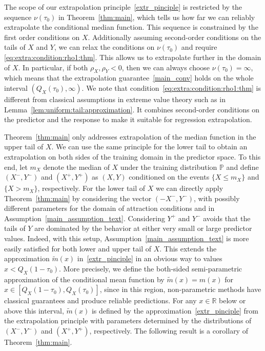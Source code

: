 \documentclass{statsoc}
\theoremstyle{break}
\newcommand{\Ptr}{\mathbb P}
\newcommand{\tauzero}{\tau_0}
\begin{document}
The scope of our extrapolation principle~\eqref{extr_pinciple} is restricted by the sequence $\nu(\tauzero)$ in Theorem~\ref{thm:main}, which tells us how far we can reliably extrapolate the conditional median function.
This sequence is constrained by the first order conditions on $X$. 
Additionally assuming second-order conditions on the tails of $X$ and $Y$, we can relax the conditions on $\nu(\tauzero)$ and require \eqref{eq:extra:condition:rho1:thm}. 
This allows us to extrapolate further in the domain of $X$. 
In particular, if both $\rho_X, \rho_Y<0$, then we can always choose $\nu(\tau_0) = \infty$, which means that the extrapolation guarantee~\eqref{main_conv} holds on the whole interval $(Q_X(\tauzero), \infty)$.
We note that condition~\eqref{eq:extra:condition:rho1:thm} is different from classical assumptions in extreme value theory such as in Lemma~\ref{lem:uniform:tail:approximation}. It combines second-order conditions on the predictor and the response to make it suitable for regression extrapolation.




Theorem~\ref{thm:main} only addresses extrapolation of the median function in the upper tail of $X$. We can use the same principle for the lower tail to obtain an extrapolation on both sides of the training domain in the predictor space.
To this end, let $m_X$ denote the median of $X$ under the training distribution $\Ptr$ and define $(X^-, Y^-)$ and $(X^+, Y^+)$ as $(X,Y)$ conditioned on the events $\{X \leq m_X\}$ and $\{X > m_X\}$, respectively.
For the lower tail of $X$ we can directly apply Theorem~\ref{thm:main} by considering the vector $(-X^-, Y^-)$, with possibly different parameters for the domain of attraction conditions and in Assumption~\ref{main_assumption_text}.
Considering $Y^+$ and $Y^-$ avoids that the tails of $Y$ are dominated by the behavior at either very small or large predictor values. Indeed, with this setup, Assumption~\ref{main_assumption_text} is more easily satisfied for both lower and upper tail of $X$.
 This extends the approximation $\tilde m(x)$ in~\eqref{extr_pinciple} in an obvious way to values $x < Q_X(1-\tauzero)$.
More precisely, we define the both-sided semi-parametric approximation of the conditional mean function by $\tilde m(x) = m(x)$ for $x \in [Q_X(1-\tauzero), Q_X(\tauzero)]$, since in this region, non-parametric methods have classical guarantees \citep[e.g.,][Section 10]{dev1996} and produce reliable predictions. For any $x\in\mathbb R$ below or above this interval, $\tilde m(x)$ is defined by the approximation~\eqref{extr_pinciple} from the extrapolation principle with parameters determined by the distributions of $(X^-, Y^-)$ and $(X^+, Y^+)$, respectively. The following result is a corollary of Theorem~\ref{thm:main}.
\end{document}
